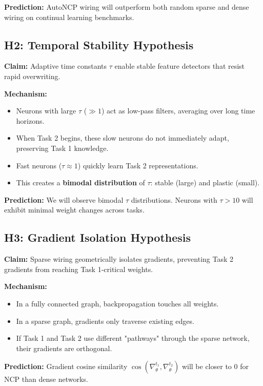 \documentclass[11pt,twocolumn]{article}
\begin{document}
\textbf{Prediction:} AutoNCP wiring will outperform both random sparse and dense wiring on continual learning benchmarks.

\subsection{H2: Temporal Stability Hypothesis}

\textbf{Claim:} Adaptive time constants $\tau$ enable stable feature detectors that resist rapid overwriting.

\textbf{Mechanism:}
\begin{itemize}
    \item Neurons with large $\tau$ ($\gg 1$) act as low-pass filters, averaging over long time horizons.
    \item When Task 2 begins, these slow neurons do not immediately adapt, preserving Task 1 knowledge.
    \item Fast neurons ($\tau \approx 1$) quickly learn Task 2 representations.
    \item This creates a \textbf{bimodal distribution} of $\tau$: stable (large) and plastic (small).
\end{itemize}

\textbf{Prediction:} We will observe bimodal $\tau$ distributions. Neurons with $\tau > 10$ will exhibit minimal weight changes across tasks.

\subsection{H3: Gradient Isolation Hypothesis}

\textbf{Claim:} Sparse wiring geometrically isolates gradients, preventing Task 2 gradients from reaching Task 1-critical weights.

\textbf{Mechanism:}
\begin{itemize}
    \item In a fully connected graph, backpropagation touches all weights.
    \item In a sparse graph, gradients only traverse existing edges.
    \item If Task 1 and Task 2 use different "pathways" through the sparse network, their gradients are orthogonal.
\end{itemize}

\textbf{Prediction:} Gradient cosine similarity $\cos(\nabla_{\theta}^{t_1}, \nabla_{\theta}^{t_2})$ will be closer to 0 for NCP than dense networks.
\end{document}
